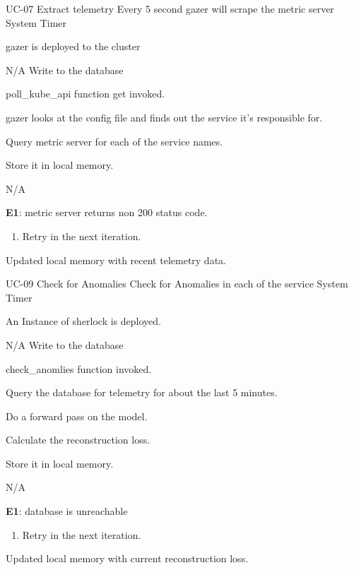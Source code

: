 \vspace{-2em}
\UseCaseDescription
{UC-07}
{Extract telemetry}
{Every 5 second \ac{gazer} will scrape the metric server}
{System Timer}
{\begin{CompactItemizes}
    \item \ac{gazer} is deployed to the cluster
\end{CompactItemizes}}
{N/A}
{Write to the database}
{\begin{CompactEnumerate}
    \item poll\_kube\_api function get invoked.
    \item \ac{gazer} looks at the config file and finds out the service it’s responsible for.
    \item Query metric server for each of the service names.
    \item Store it in local memory.
\end{CompactEnumerate}}
{{N/A}
{\textbf{E1}: metric server returns non 200 status code.
\vspace{-4mm}\begin{enumerate}
    \item Retry in the next iteration.
\vspace{-7mm}\end{enumerate}}
{\begin{CompactItemizes}
    \item Updated local memory with recent telemetry data.
\end{CompactItemizes}}}

\vspace{-2em}
\UseCaseDescription
{UC-09}
{Check for Anomalies}
{Check for Anomalies in each of the service}
{System Timer}
{\begin{CompactItemizes}
    \item An Instance of \ac{sherlock} is deployed.
\end{CompactItemizes}}
{N/A}
{Write to the database}
{\begin{CompactEnumerate}
    \item check\_anomlies function invoked.
    \item Query the database for telemetry for about the last 5 minutes.
    \item Do a forward pass on the model.
    \item Calculate the reconstruction loss.
    \item Store it in local memory.
\end{CompactEnumerate}}
{{N/A}
{\textbf{E1}: database is unreachable
\vspace{-4mm}\begin{enumerate}
    \item Retry in the next iteration.
\vspace{-7mm}\end{enumerate}}
{\begin{CompactItemizes}
    \item Updated local memory with current reconstruction loss.
\end{CompactItemizes}}}
